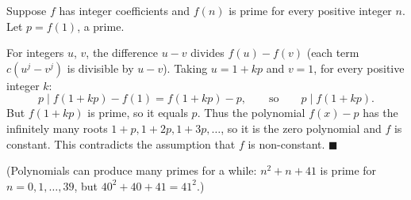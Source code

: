 Suppose $f$ has integer coefficients and $f(n)$ is prime for every positive integer $n$. Let $p=f(1)$, a prime.

For integers $u$, $v$, the difference $u-v$ divides $f(u)-f(v)$ (each term $c\left(u^j-v^j\right)$ is divisible by $u-v$). Taking $u=1+kp$ and $v=1$, for every positive integer $k$:
\[
p\mid f(1+kp)-f(1)=f(1+kp)-p ,\qquad\text{so}\qquad p\mid f(1+kp).
\]
But $f(1+kp)$ is prime, so it equals $p$. Thus the polynomial $f(x)-p$ has the infinitely many roots $1+p,1+2p,1+3p,\dots$, so it is the zero polynomial and $f$ is constant. This contradicts the assumption that $f$ is non-constant. $\blacksquare$

(Polynomials can produce many primes for a while: $n^2+n+41$ is prime for $n=0,1,\dots,39$, but $40^2+40+41=41^2$.)
